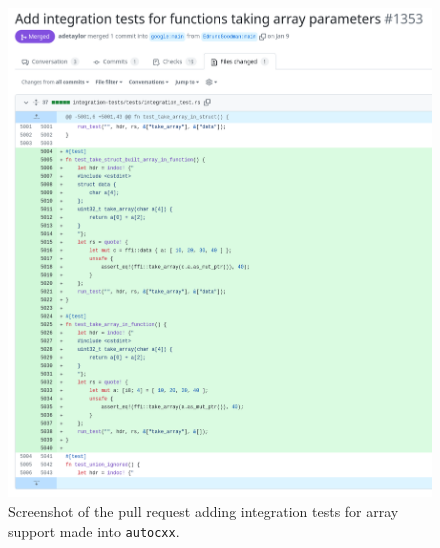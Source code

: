 \begin{figure}[H]
    \centering
    \includegraphics[width=\textwidth]{images/8_appendix/autocxx_pr.png}
    \caption{Screenshot of the pull request adding integration tests for array support made into \texttt{autocxx}.}
    \label{fig:autocxx_pr}
\end{figure}